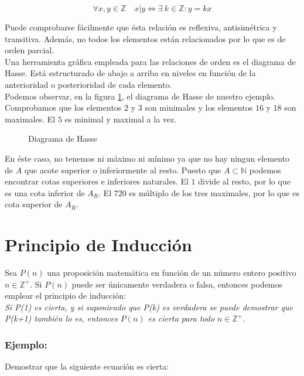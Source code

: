 \documentclass[0_algebra.tex]{subfiles}
\begin{document}
$$
\forall x,y \in \mathbb{Z}\quad x|y \Leftrightarrow \exists \  k \in \mathbb{Z}: y=kx
$$

Puede comprobarse fácilmente que ésta relación es reflexiva, antisimétrica y transitiva. Además, no todos los elementos están relacionados por lo que es de orden parcial.\\

Una herramienta gráfica empleada para las relaciones de orden es el diagrama de Hasse. Está estructurado de abajo a arriba en niveles en función de la anterioridad o posterioridad de cada elemento.\\

Podemos observar, en la figura \ref{hasse}, el diagrama de Hasse de nuestro ejemplo. Comprobamos que los elementos $2$ y $3$ son minimales y los elementos $16$ y $18$ son maximales. El $5$ es minimal y maximal a la vez.\\


\begin{figure}[h]
\centering

\caption{Diagrama de Hasse}
\label{hasse}
\end{figure}

\newpage

En éste caso, no tenemos ni máximo ni mínimo ya que no hay ningun elemento de $A$ que acote superior o inferiormente al resto. Puesto que $A\subset \mathbb{N}$ podemos encontrar cotas superiores e inferiores naturales. El $1$  divide al resto, por lo que es una cota inferior de $A_R$. El $720$ es múltiplo de los tres maximales, por lo que es cota superior de $A_R$.\\

\section{Principio de Inducción}

Sea $P(n)$ una proposición matemática en función de un número entero positivo $n\in \mathbb{Z}^+$. Si $P(n)$ puede ser únicamente verdadera o falsa, entonces podemos emplear el principio de inducción:\\

\emph{Si P(1) es cierta, y si suponiendo que P(k) es verdadera se puede demostrar que P(k+1) también lo es, entonces $P(n)$ es cierta para todo $n\in \mathbb{Z}^+$.}

\subsubsection*{Ejemplo:}
Demostrar que la siguiente ecuación es cierta:
\end{document}
